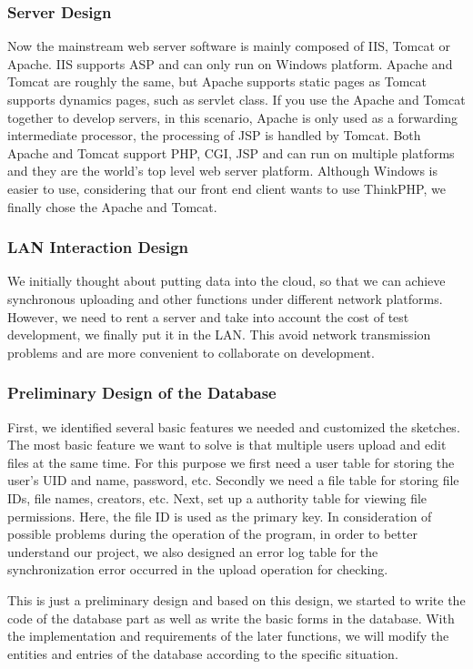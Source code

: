 \subsubsection{Server Design}
\noindent Now the mainstream web server software is mainly composed of IIS, Tomcat or Apache. IIS supports ASP and can only run on Windows platform. Apache and Tomcat are roughly the same, but Apache supports static pages as Tomcat supports dynamics pages, such as servlet class. If you use the Apache and Tomcat together to develop servers, in this scenario, Apache is only used as a forwarding intermediate processor, the processing of JSP is handled by Tomcat. Both Apache and Tomcat support PHP, CGI, JSP and can run on multiple platforms and they are the world's top level web server platform. Although Windows is easier to use, considering that our front end client wants to use ThinkPHP, we finally chose the Apache and Tomcat.

\subsubsection{LAN Interaction Design}
\noindent We initially thought about putting data into the cloud, so that we can achieve synchronous uploading and other functions under different network platforms. However, we need to rent a server and take into account the cost of test development, we finally put it in the LAN. This avoid network transmission problems and are more convenient to collaborate on development.

\subsubsection{Preliminary Design of the Database}
\noindent First, we identified several basic features we needed and customized the sketches. The most basic feature we want to solve is that multiple users upload and edit files at the same time. For this purpose we first need a user table for storing the user's UID and name, password, etc. Secondly we need a file table for storing file IDs, file names, creators, etc. Next, set up a authority table for viewing file permissions. Here, the file ID is used as the primary key. In consideration of possible problems during the operation of the program, in order to better understand our project, we also designed an error log table for the synchronization error occurred in the upload operation for checking.

\vspace{0.3cm}
\noindent This is just a preliminary design and based on this design, we started to write the code of the database part as well as write the basic forms in the database. With the implementation and requirements of the later functions, we will modify the entities and entries of the database according to the specific situation.


